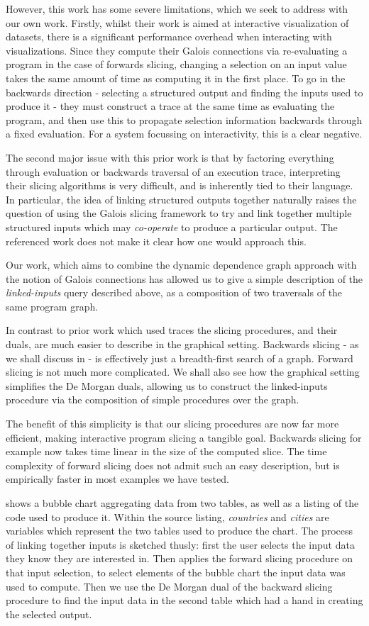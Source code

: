 However, this work has some severe limitations, which we seek to address with our own work.
Firstly, whilst their work is aimed at interactive visualization of datasets, there is a
significant performance overhead when interacting with visualizations. Since they compute
their Galois connections via re-evaluating a program in the case of forwards slicing,
changing a selection on an input value takes the same amount of time as computing it
in the first place. To go in the backwards direction - selecting a structured output and
finding the inputs used to produce it - they must construct a trace at the same time as
evaluating the program, and then use this to propagate selection information backwards
through a fixed evaluation. For a system focussing on interactivity, this is a clear negative.

The second major issue with this prior work is that by factoring everything through evaluation
or backwards traversal of an execution trace, interpreting their slicing algorithms is
very difficult, and is inherently tied to their language. In particular, the idea of linking
structured outputs together naturally raises the question of using the Galois slicing framework
to try and link together multiple structured inputs which may \textit{co-operate} to produce
a particular output. The referenced work does not make it clear how one would approach this.

Our work, which aims to combine the dynamic dependence graph approach with the notion of Galois
connections has allowed us to give a simple description of the \textit{linked-inputs}
query described above, as a composition of two traversals of the same program graph.

In contrast to prior work which used traces the slicing procedures, and their duals, are
much easier to describe in the graphical setting. Backwards slicing -  as we shall discuss
in  - is effectively just a breadth-first search of a graph. Forward slicing
is not much more complicated. We shall also see how the graphical setting simplifies the De Morgan duals,
allowing us to construct the linked-inputs procedure via the composition of simple procedures
over the graph.

The benefit of this simplicity is that our slicing procedures are now far more efficient,
making interactive program slicing a tangible goal. Backwards slicing for example now takes
time linear in the size of the computed slice. The time complexity of forward slicing does not
admit such an easy description, but is empirically faster in most examples we have tested.

 shows a bubble chart aggregating data from two tables, as well
as a listing of the code used to produce it. Within the source listing, \textit{countries}
and \textit{cities} are variables which represent the two tables used to produce the chart.
The process of linking together inputs is sketched thusly: first the user selects the input data
they know they are interested in. Then \OurLang applies the forward slicing procedure on that
input selection, to select elements of the bubble chart the input data was used to compute.
Then we use the De Morgan dual of the backward slicing procedure to find the input
data in the second table which had a hand in creating the selected output.
